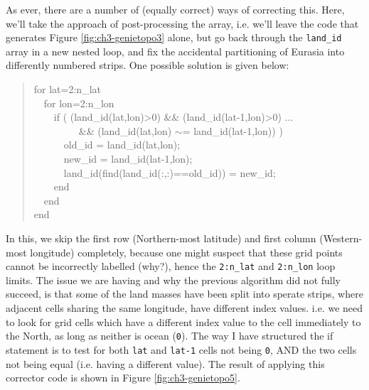 \documentclass{tufte-book} %
\newenvironment{docspec}{\begin{quotation}\ttfamily\parskip0pt\parindent0pt\ignorespaces}{\end{quotation}}
\begin{document}
As ever, there are a number of (equally correct) ways of correcting this. Here, we'll take the approach of post-processing the array, i.e. we'll leave the code that generates Figure \ref{fig:ch3-genietopo3} alone, but go back through the \texttt{land\_id} array in a new nested loop, and fix the accidental partitioning of Eurasia into differently numbered strips. One possible solution is given below:
\begin{docspec}
for lat=2:n\_lat
\\ \ \ for lon=2:n\_lon
\\\ \ \ \ if ( (land\_id(lat,lon)>0) \&\& (land\_id(lat-1,lon)>0) ...
\\\ \ \ \ \ \ \ \ \ \&\& (land\_id(lat,lon) \(\sim\)= land\_id(lat-1,lon)) )
\\\ \ \ \ \ \ old\_id = land\_id(lat,lon);
\\\ \ \ \ \ \ new\_id = land\_id(lat-1,lon);
\\\ \ \ \ \ \ land\_id(find(land\_id(:,:)==old\_id)) = new\_id;
\\\ \ \ \ end
\\\ \ end
\\ end
\end{docspec}
In this, we skip the first row (Northern-most latitude) and first column (Western-most longitude) completely, because one might suspect that these grid points cannot be incorrectly labelled (why?), hence the \texttt{2:n\_lat} and \texttt{2:n\_lon} loop limits. The issue we are having and why the previous algorithm did not fully succeed, is that some of the land masses have been split into sperate strips, where adjacent cells sharing the same longitude, have different index values. i.e. we need to look for grid cells which have a different index value to the cell immediately to the North, as long as neither is ocean (\texttt{0}). The way I have structured the if statement is to test for both \texttt{lat} and \texttt{lat-1} cells not being \texttt{0}, AND the two cells not being equal (i.e. having a different value). The result of applying this corrector code is shown in Figure \ref{fig:ch3-genietopo5}.
\end{document}

